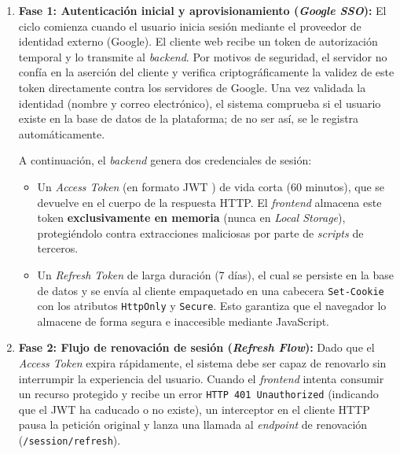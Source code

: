 \begin{enumerate}
    \item \textbf{Fase 1: Autenticación inicial y aprovisionamiento (\emph{Google SSO}):} 
    El ciclo comienza cuando el usuario inicia sesión mediante el proveedor de identidad externo (Google). El cliente web recibe un token de autorización temporal y lo transmite al \emph{backend}. Por motivos de seguridad, el servidor no confía en la aserción del cliente y verifica criptográficamente la validez de este token directamente contra los servidores de Google. Una vez validada la identidad (nombre y correo electrónico), el sistema comprueba si el usuario existe en la base de datos de la plataforma; de no ser así, se le registra automáticamente. 
    
    A continuación, el \emph{backend} genera dos credenciales de sesión:
    \begin{itemize}
        \item Un \emph{Access Token} (en formato \ac{JWT} \cite{rfc7519}) de vida corta (60 minutos), que se devuelve en el cuerpo de la respuesta HTTP. El \emph{frontend} almacena este token \textbf{exclusivamente en memoria} (nunca en \emph{Local Storage}), protegiéndolo contra extracciones maliciosas por parte de \emph{scripts} de terceros.
        \item Un \emph{Refresh Token} de larga duración (7 días), el cual se persiste en la base de datos y se envía al cliente empaquetado en una cabecera \texttt{Set-Cookie} con los atributos \texttt{HttpOnly} y \texttt{Secure}. Esto garantiza que el navegador lo almacene de forma segura e inaccesible mediante JavaScript.
    \end{itemize}

    \item \textbf{Fase 2: Flujo de renovación de sesión (\emph{Refresh Flow}):}
    Dado que el \emph{Access Token} expira rápidamente, el sistema debe ser capaz de renovarlo sin interrumpir la experiencia del usuario. Cuando el \emph{frontend} intenta consumir un recurso protegido y recibe un error \texttt{HTTP 401 Unauthorized} (indicando que el \ac{JWT} ha caducado o no existe), un interceptor en el cliente HTTP pausa la petición original y lanza una llamada al \emph{endpoint} de renovación (\texttt{/session/refresh}).
    

\end{enumerate}
